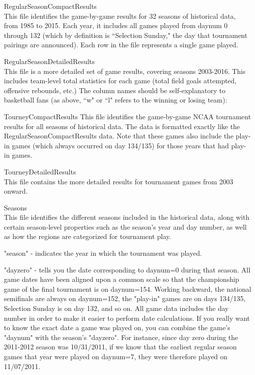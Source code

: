 \documentclass{article} %
\begin{document}
RegularSeasonCompactResults\\
This file identifies the game-by-game results for 32 seasons of historical data, from 1985 to 2015. Each year, it includes all games played from daynum 0 through 132 (which by definition is ``Selection Sunday," the day that tournament pairings are announced). Each row in the file represents a single game played.


RegularSeasonDetailedResults\\
This file is a more detailed set of game results, covering seasons 2003-2016. This includes team-level total statistics for each game (total field goals attempted, offensive rebounds, etc.) The column names should be self-explanatory to basketball fans (as above, ``w" or ``l" refers to the winning or losing team):


TourneyCompactResults
This file identifies the game-by-game NCAA tournament results for all seasons of historical data. The data is formatted exactly like the RegularSeasonCompactResults data. Note that these games also include the play-in games (which always occurred on day 134/135) for those years that had play-in games.

TourneyDetailedResults\\
This file contains the more detailed results for tournament games from 2003 onward.


Seasons\\
This file identifies the different seasons included in the historical data, along with certain season-level properties such as the season's year and day number, as well as how the regions are categorized for tournament play.

"season" - indicates the year in which the tournament was played.

"dayzero" - tells you the date corresponding to daynum=0 during that season. All game dates have been aligned upon a common scale so that the championship game of the final tournament is on daynum=154. Working backward, the national semifinals are always on daynum=152, the "play-in" games are on days 134/135, Selection Sunday is on day 132, and so on. All game data includes the day number in order to make it easier to perform date calculations. If you really want to know the exact date a game was played on, you can combine the game's "daynum" with the season's "dayzero". For instance, since day zero during the 2011-2012 season was 10/31/2011, if we know that the earliest regular season games that year were played on daynum=7, they were therefore played on 11/07/2011.
\end{document}
